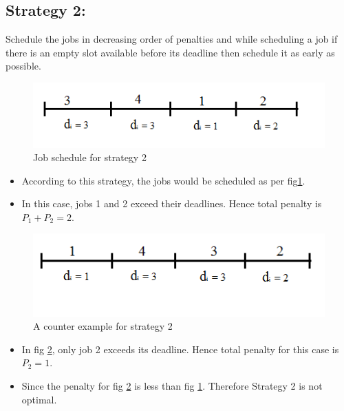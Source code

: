 \documentclass[pdftex,a4paper,12pt]{report}
\begin{document}
\subsection{Strategy 2:}Schedule the jobs in decreasing order of penalties and while scheduling a job if there is an empty slot
available before its deadline then schedule it as early as possible.
\begin{figure}[h]
\centering
\includegraphics[scale=0.5]{fig2.png}
\caption{Job schedule for strategy 2}
\label{fig3}
\end{figure}
\begin{itemize}
\item According to this strategy, the jobs would be scheduled as per fig\ref{fig3}.
\item In this case, jobs 1 and 2 exceed their deadlines. Hence total penalty is $P_{1} + P_{2} = 2$.
\end{itemize}
\begin{figure}[h]
\centering
\includegraphics[scale=0.5]{fig3.png}
\caption{A counter example for strategy 2}
\label{fig4}
\end{figure}
\begin{itemize}
\item In fig \ref{fig4}, only job 2 exceeds its deadline. Hence total penalty for this case is $P_{2} = 1$.
\item Since the penalty for fig \ref{fig4} is less than fig \ref{fig3}. Therefore Strategy 2 is not optimal.
\end{itemize}
\end{document}
